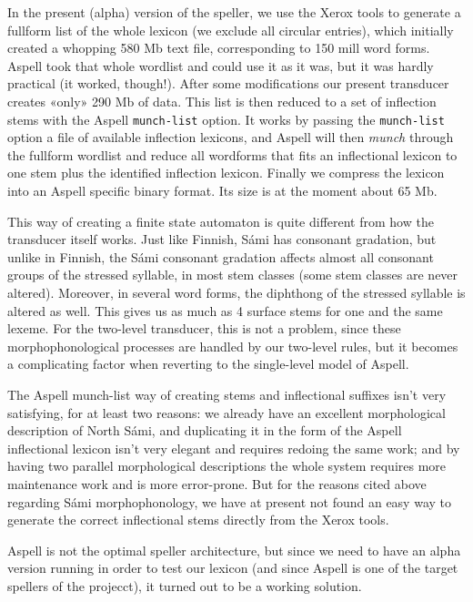 \documentclass[a4paper,english]{article}
\begin{document}
In  the present (alpha) version of the speller, we use the Xerox tools to generate a fullform list of the whole lexicon (we exclude all circular entries), which initially created a whopping 580 Mb text file, corresponding to 150 mill word forms. Aspell took that whole wordlist and could use it as it was, but it was hardly practical (it worked, though!). After some modifications our present transducer creates «only» 290 Mb of data. This list is then reduced to a set of inflection stems with the Aspell \texttt{munch-list} option. It works by passing the \texttt{munch-list} option a file of available inflection lexicons, and Aspell will then \textit{munch} through the fullform wordlist and reduce all wordforms that fits an inflectional lexicon to one stem plus the identified inflection lexicon. Finally we compress the lexicon into an Aspell specific binary format. Its size is at the moment about 65 Mb.

This way of creating a finite state automaton is quite different from how the transducer itself works. Just like Finnish, Sámi has consonant gradation, but unlike in Finnish, the Sámi consonant gradation affects almost all consonant groups of the stressed syllable, in most stem classes (some stem classes are never altered). Moreover, in several word forms, the diphthong of the stressed syllable is altered as well. This gives us as much as 4 surface stems for one and the same lexeme. For the two-level transducer, this is not a problem, since these morphophonological processes are handled by our two-level rules, but it becomes a complicating factor when reverting to the single-level model of Aspell.

The Aspell munch-list way of creating stems and inflectional suffixes isn't very satisfying, for at least two reasons: we already have an excellent morphological description of North Sámi, and duplicating it in the form of the Aspell inflectional lexicon isn't very elegant and requires redoing the same work; and by having two parallel morphological descriptions the whole system requires more maintenance work and is more error-prone. But for the reasons cited above regarding Sámi morphophonology, we have at present not found an easy way to generate the correct inflectional stems directly from the Xerox tools.

Aspell is not the optimal speller architecture, but since we need to have an alpha version running in order to test our lexicon (and since Aspell is one of the target spellers of the projecct), it turned out to be a working solution.
\end{document}
